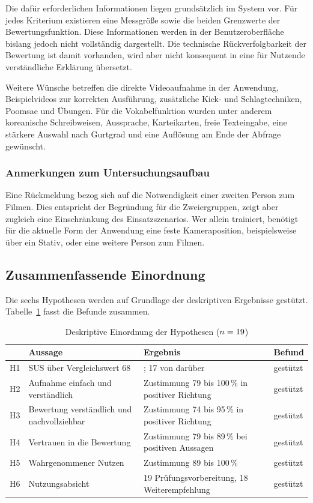 \documentclass[intern]{cgMA}
\begin{document}
Die dafür erforderlichen Informationen liegen grundsätzlich im System vor. Für jedes Kriterium existieren eine Messgröße sowie die beiden Grenzwerte der Bewertungsfunktion. Diese Informationen werden in der Benutzeroberfläche bislang jedoch nicht vollständig dargestellt. Die technische Rückverfolgbarkeit der Bewertung ist damit vorhanden, wird aber nicht konsequent in eine für Nutzende verständliche Erklärung übersetzt.

Weitere Wünsche betreffen die direkte Videoaufnahme in der Anwendung, Beispielvideos zur korrekten Ausführung, zusätzliche Kick- und Schlagtechniken, Poomsae und Übungen. Für die Vokabelfunktion wurden unter anderem koreanische Schreibweisen, Aussprache, Karteikarten, freie Texteingabe, eine stärkere Auswahl nach Gurtgrad und eine Auflösung am Ende der Abfrage gewünscht.

\subsubsection{Anmerkungen zum Untersuchungsaufbau}
Eine Rückmeldung bezog sich auf die Notwendigkeit einer zweiten Person zum Filmen. Dies entspricht der Begründung für die Zweiergruppen, zeigt aber zugleich eine Einschränkung des Einsatzszenarios. Wer allein trainiert, benötigt für die aktuelle Form der Anwendung eine feste Kameraposition, beispielsweise über ein Stativ, oder eine weitere Person zum Filmen.

\subsection{Zusammenfassende Einordnung}
\label{sec:eval_einordnung}
Die sechs Hypothesen werden auf Grundlage der deskriptiven Ergebnisse gestützt. Tabelle~\ref{tab:eval_hypergebnis} fasst die Befunde zusammen.

\begin{table}[htbp]
\centering
\small
\begin{tabular}{p{} p{} p{} p{}}
\hline
& \textbf{Aussage} & \textbf{Ergebnis} & \textbf{Befund} \\ \hline
H1 & SUS über Vergleichswert 68 & \SUSm{}; 17 von \Nteiln{} darüber & gestützt \\
H2 & Aufnahme einfach und verständlich & Zustimmung 79 bis 100\,\% in positiver Richtung & gestützt \\
H3 & Bewertung verständlich und nachvollziehbar & Zustimmung 74 bis 95\,\% in positiver Richtung & gestützt \\
H4 & Vertrauen in die Bewertung & Zustimmung 79 bis 89\,\% bei positiven Aussagen & gestützt \\
H5 & Wahrgenommener Nutzen & Zustimmung 89 bis 100\,\% & gestützt \\
H6 & Nutzungsabsicht & 19 Prüfungsvorbereitung, 18 Weiterempfehlung & gestützt \\ \hline
\end{tabular}
\caption{Deskriptive Einordnung der Hypothesen ($n=19$)}
\label{tab:eval_hypergebnis}
\end{table}
\end{document}
